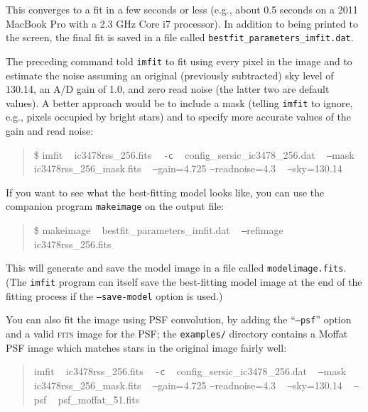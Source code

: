 \documentclass[10pt,a4paper,article]{memoir}
\newcommand{\imfitprog}{\texttt{imfit}}
\newcommand{\makeimage}{\texttt{makeimage}}
\begin{document}
This converges to a fit in a few seconds or less (e.g., about 0.5 seconds on a 
2011 MacBook Pro with a 2.3 GHz Core i7 processor). In addition to being printed to
the screen, the final fit is saved in a file called \texttt{bestfit\_parameters\_imfit.dat}.

The preceding command told \imfitprog{} to fit using every pixel in the image and to estimate
the noise assuming an original (previously subtracted) sky level of 130.14, an A/D gain
of 1.0, and zero read noise (the latter two are default values). A better approach would be 
to include a mask (telling \imfitprog{}
to ignore, e.g., pixels occupied by bright stars) and to specify more accurate values
of the gain and read noise:
\begin{quote}
\$ imfit ~ ic3478rss\_256.fits ~ \texttt{-c} ~ config\_sersic\_ic3478\_256.dat ~ \texttt{--}mask ~ ic3478rss\_256\_mask.fits ~ \texttt{--}gain=4.725 \texttt{--}readnoise=4.3 ~ \texttt{--}sky=130.14
\end{quote}

If you want to see what the best-fitting model looks like, you can use the companion program \makeimage{}
on the output file:
\begin{quote}
\$ makeimage ~ bestfit\_parameters\_imfit.dat ~ \texttt{--}refimage ~ ic3478rss\_256.fits
\end{quote}
This will generate and save the model image in a file called \texttt{modelimage.fits}. (The \imfitprog{}
program 
can itself save the best-fitting model image at the end of the fitting process if
the \texttt{--save-model} option is used.)


You can also fit the image using PSF convolution, by adding the ``\texttt{--psf}'' option and a
valid \textsc{fits} image for the PSF; the \texttt{examples/} directory contains a Moffat PSF image which
matches stars in the original image fairly well:
\begin{quote}
imfit ~ ic3478rss\_256.fits ~ \texttt{-c} ~ config\_sersic\_ic3478\_256.dat ~ \texttt{--}mask ~ ic3478rss\_256\_mask.fits ~ \texttt{--}gain=4.725 \texttt{--}readnoise=4.3 ~ \texttt{--}sky=130.14 ~ \texttt{--}psf ~ psf\_moffat\_51.fits
\end{quote}
\end{document}
